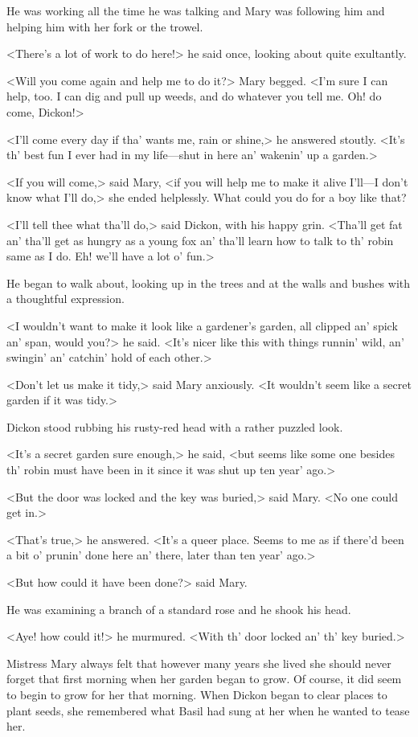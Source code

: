 He was working all the time he was talking and Mary was following him and helping him with her fork or the trowel.

<There's a lot of work to do here!> he said once, looking about quite exultantly.

<Will you come again and help me to do it?> Mary begged. <I'm sure I can help, too. I can dig and pull up weeds, and do whatever you tell me. Oh! do come, Dickon!>

<I'll come every day if tha' wants me, rain or shine,> he answered stoutly. <It's th' best fun I ever had in my life—shut in here an' wakenin' up a garden.>

<If you will come,> said Mary, <if you will help me to make it alive I'll—I don't know what I'll do,> she ended helplessly. What could you do for a boy like that?

<I'll tell thee what tha'll do,> said Dickon, with his happy grin. <Tha'll get fat an' tha'll get as hungry as a young fox an' tha'll learn how to talk to th' robin same as I do. Eh! we'll have a lot o' fun.>

He began to walk about, looking up in the trees and at the walls and bushes with a thoughtful expression.

<I wouldn't want to make it look like a gardener's garden, all clipped an' spick an' span, would you?> he said. <It's nicer like this with things runnin' wild, an' swingin' an' catchin' hold of each other.>

<Don't let us make it tidy,> said Mary anxiously. <It wouldn't seem like a secret garden if it was tidy.>

Dickon stood rubbing his rusty-red head with a rather puzzled look.

<It's a secret garden sure enough,> he said, <but seems like some one besides th' robin must have been in it since it was shut up ten year' ago.>

<But the door was locked and the key was buried,> said Mary. <No one could get in.>

<That's true,> he answered. <It's a queer place. Seems to me as if there'd been a bit o' prunin' done here an' there, later than ten year' ago.>

<But how could it have been done?> said Mary.

He was examining a branch of a standard rose and he shook his head.

<Aye! how could it!> he murmured. <With th' door locked an' th' key buried.>

Mistress Mary always felt that however many years she lived she should never forget that first morning when her garden began to grow. Of course, it did seem to begin to grow for her that morning. When Dickon began to clear places to plant seeds, she remembered what Basil had sung at her when he wanted to tease her.

